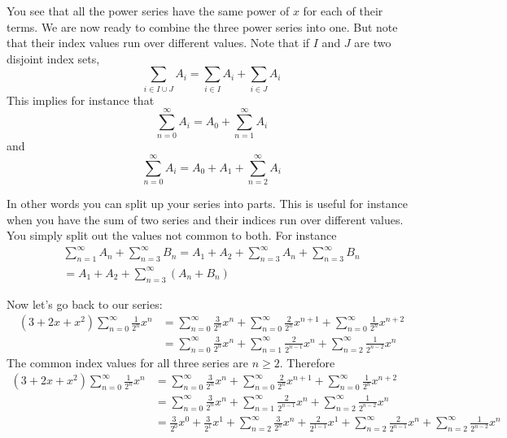 You see that all the power series have the same power of $x$ for each of their
terms.
We are now ready to combine the three power series into one.
But note that their index values run over different values.
Note that if $I$ and $J$ are two disjoint index sets, 
\[
\sum_{i \in I \cup J} A_i
=
\sum_{i \in I} A_i
+
\sum_{i \in J} A_i
\]
This implies for instance that
\[
\sum_{n = 0}^\infty A_i = 
A_0 + \sum_{n = 1}^\infty A_i 
\]
and 
\[
\sum_{n = 0}^\infty A_i = 
A_0 + A_1 + \sum_{n = 2}^\infty A_i 
\]

In other words you can split up your series
into parts.
This is useful for instance when you have the 
sum of two series and their indices run over different values.
You simply split out the values not common to both.
For instance 
\begin{align*}
\sum_{n = 1}^\infty A_n + \sum_{n = 3}^\infty B_n
= A_1 + A_2 + \sum_{n = 3}^\infty A_n + \sum_{n = 3}^\infty B_n \\
= A_1 + A_2 + \sum_{n = 3}^\infty (A_n + B_n)
\end{align*}

Now let's go back to our series:
\begin{align*}
(3 + 2x + x^2) \sum_{n = 0}^\infty \frac{1}{2^n}x^n
&= \sum_{n = 0}^\infty \frac{3}{2^n}x^n
+ \sum_{n = 0}^\infty \frac{2}{2^n}x^{n+1}
+ \sum_{n = 0}^\infty \frac{1}{2^n}x^{n+2} \\
&=
\sum_{n = 0}^\infty \frac{3}{2^n}x^n
+ \sum_{n = 1}^\infty \frac{2}{2^{n-1}}x^{n}
+ \sum_{n = 2}^\infty \frac{1}{2^{n-2}}x^{n}
\end{align*}
The common index values for all three series are $n \geq 2$. 
Therefore
\begin{align*}
(3 + 2x + x^2) \sum_{n = 0}^\infty \frac{1}{2^n}x^n
&= \sum_{n = 0}^\infty \frac{3}{2^n}x^n
+ \sum_{n = 0}^\infty \frac{2}{2^n}x^{n+1}
+ \sum_{n = 0}^\infty \frac{1}{2^n}x^{n+2} \\
&=
\sum_{n = 0}^\infty \frac{3}{2^n}x^n
+ \sum_{n = 1}^\infty \frac{2}{2^{n-1}}x^{n}
+ \sum_{n = 2}^\infty \frac{1}{2^{n-2}}x^{n} \\
&=
\frac{3}{2^0}x^0 +
\frac{3}{2^1}x^1 +
\sum_{n = 2}^\infty \frac{3}{2^n}x^n
+ \frac{2}{2^{1-1}}x^{1} + \sum_{n = 2}^\infty \frac{2}{2^{n-1}}x^{n}
+ \sum_{n = 2}^\infty \frac{1}{2^{n-2}}x^{n}
\end{align*}

